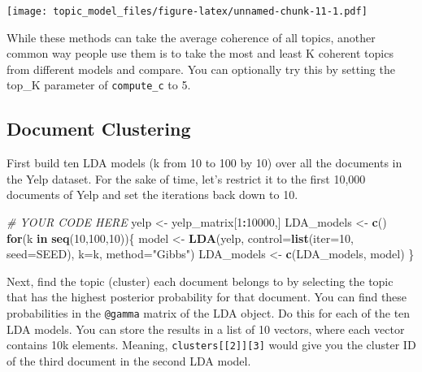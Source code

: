 \documentclass[]{article}
\newenvironment{Shaded}{\begin{snugshade}}{\end{snugshade}}
\newcommand{\CommentTok}[1]{\textcolor[rgb]{0.56,0.35,0.01}{\textit{#1}}}
\newcommand{\ControlFlowTok}[1]{\textcolor[rgb]{0.13,0.29,0.53}{\textbf{#1}}}
\newcommand{\DataTypeTok}[1]{\textcolor[rgb]{0.13,0.29,0.53}{#1}}
\newcommand{\DecValTok}[1]{\textcolor[rgb]{0.00,0.00,0.81}{#1}}
\newcommand{\KeywordTok}[1]{\textcolor[rgb]{0.13,0.29,0.53}{\textbf{#1}}}
\newcommand{\NormalTok}[1]{#1}
\newcommand{\OperatorTok}[1]{\textcolor[rgb]{0.81,0.36,0.00}{\textbf{#1}}}
\newcommand{\StringTok}[1]{\textcolor[rgb]{0.31,0.60,0.02}{#1}}
\begin{document}
\texttt{[image: topic\_model\_files/figure-latex/unnamed-chunk-11-1.pdf]}

While these methods can take the average coherence of all topics,
another common way people use them is to take the most and least K
coherent topics from different models and compare. You can optionally
try this by setting the top\_K parameter of \texttt{compute\_c} to 5.

\hypertarget{document-clustering}{%
\subsection{Document Clustering}\label{document-clustering}}

First build ten LDA models (k from 10 to 100 by 10) over all the
documents in the Yelp dataset. For the sake of time, let's restrict it
to the first 10,000 documents of Yelp and set the iterations back down
to 10.

\begin{Shaded}
\begin{Highlighting}[]
\CommentTok{# YOUR CODE HERE}
\NormalTok{yelp <-}\StringTok{ }\NormalTok{yelp_matrix[}\DecValTok{1}\OperatorTok{:}\DecValTok{10000}\NormalTok{,]}
\NormalTok{LDA_models <-}\StringTok{ }\KeywordTok{c}\NormalTok{()}
\ControlFlowTok{for}\NormalTok{(k }\ControlFlowTok{in} \KeywordTok{seq}\NormalTok{(}\DecValTok{10}\NormalTok{,}\DecValTok{100}\NormalTok{,}\DecValTok{10}\NormalTok{))\{}
\NormalTok{  model <-}\StringTok{ }\KeywordTok{LDA}\NormalTok{(yelp, }\DataTypeTok{control=}\KeywordTok{list}\NormalTok{(}\DataTypeTok{iter=}\DecValTok{10}\NormalTok{, }\DataTypeTok{seed=}\NormalTok{SEED), }\DataTypeTok{k=}\NormalTok{k, }\DataTypeTok{method=}\StringTok{"Gibbs"}\NormalTok{)}
\NormalTok{  LDA_models <-}\StringTok{ }\KeywordTok{c}\NormalTok{(LDA_models, model)}
\NormalTok{\}}
\end{Highlighting}
\end{Shaded}

Next, find the topic (cluster) each document belongs to by selecting the
topic that has the highest posterior probability for that document. You
can find these probabilities in the \texttt{@gamma} matrix of the LDA
object. Do this for each of the ten LDA models. You can store the
results in a list of 10 vectors, where each vector contains 10k
elements. Meaning, \texttt{clusters{[}{[}2{]}{]}{[}3{]}} would give you
the cluster ID of the third document in the second LDA model.
\end{document}

